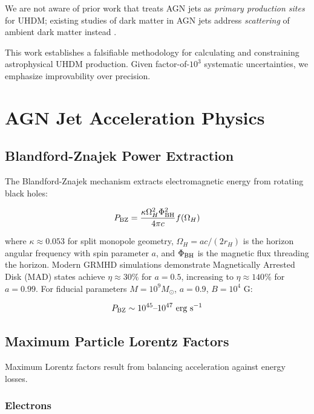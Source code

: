 \documentclass[twocolumn,superscriptaddress,prd,nofootinbib]{revtex4-2}
\begin{document}
We are not aware of prior work that treats AGN jets as \emph{primary production sites} for UHDM; existing studies of dark matter in AGN jets address \emph{scattering} of ambient dark matter instead \citep{Gorchtein2010}.

This work establishes a falsifiable methodology for calculating and constraining astrophysical UHDM production. Given factor-of-$10^3$ systematic uncertainties, we emphasize improvability over precision.

\section{AGN Jet Acceleration Physics}
\label{sec:acceleration}

\subsection{Blandford-Znajek Power Extraction}

The Blandford-Znajek mechanism \citep{BlandfordZnajek1977} extracts electromagnetic energy from rotating black holes:

\begin{equation}
P_{\rm BZ} = \frac{\kappa \Omega_H^2 \Phi_{\rm BH}^2}{4\pi c} f(\Omega_H)
\label{eq:BZ_power}
\end{equation}

\noindent where $\kappa \approx 0.053$ for split monopole geometry, $\Omega_H = ac/(2r_H)$ is the horizon angular frequency with spin parameter $a$, and $\Phi_{\rm BH}$ is the magnetic flux threading the horizon. Modern GRMHD simulations \citep{Tchekhovskoy2010,McKinney2012} demonstrate Magnetically Arrested Disk (MAD) states achieve $\eta \approx 30\%$ for $a = 0.5$, increasing to $\eta \approx 140\%$ for $a = 0.99$. For fiducial parameters $M = 10^9 M_\odot$, $a = 0.9$, $B = 10^4$ G:

\begin{equation}
P_{\rm BZ} \sim 10^{45}\text{--}10^{47} \text{ erg s}^{-1}
\label{eq:BZ_fiducial}
\end{equation}

\subsection{Maximum Particle Lorentz Factors}

Maximum Lorentz factors result from balancing acceleration against energy losses.

\subsubsection{Electrons}
\end{document}
